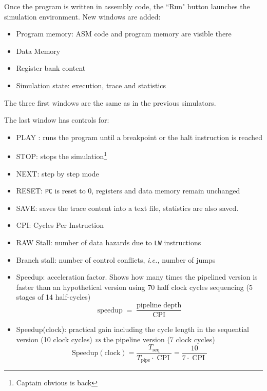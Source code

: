 \documentclass[10pt,a4paper]{article}
\theoremstyle{definition}%
\newcommand{\on}[1]{\operatorname{#1}}
\begin{document}
Once the program is written in assembly code, the ``Run" button launches the simulation environment. New windows are added:
\begin{itemize}
\item Program memory: ASM code and program memory are visible there
\item Data Memory
\item Register bank content
\item Simulation state: execution, trace and statistics
\end{itemize}
%
The three first windows are the same as in the previous simulators.

The last window has controls for:
\begin{itemize}
\item PLAY : runs the program until a breakpoint or the halt instruction is reached
\item STOP: stops the simulation\footnote{Captain obvious is back}
\item NEXT: step by step mode
\item RESET: \verb!PC! is reset to 0, registers and data memory remain unchanged
\item SAVE: saves the trace content into a text file, statistics are also saved.
\item CPI: Cycles Per Instruction
\item RAW Stall: number of data hazards due to \verb!LW! instructions
\item Branch stall: number of control conflicts, \textit{i.e.,} number of jumps
\item Speedup: acceleration factor. Shows how many times the pipelined version is faster than an hypothetical version using 70 half clock cycles sequencing (5 stages of 14 half-cycles)
$$\on{speedup}=\frac{\on{pipeline~depth}}{\on{CPI}}$$
\item Speedup(clock): practical gain including the cycle length in the sequential version (10 clock cycles) \textit{vs} the pipeline version (7 clock cycles)
$$\on{Speedup(clock)}=\frac{T_{\on{seq}}}{T_{\on{pipe}}\cdot\on{CPI}}=\frac{10}{7\cdot \on{CPI}}$$
\end{itemize}
\end{document}
